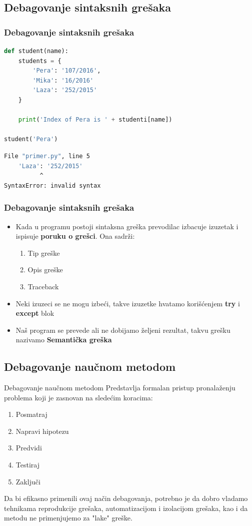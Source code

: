 \documentclass{beamer}
\begin{document}
\subsection{Debagovanje sintaksnih grešaka}
\begin{frame}[fragile]
\frametitle{Debagovanje sintaksnih grešaka}
\begin{exampleblock}{}
\begin{lstlisting}[language = python]
def student(name):
    students = {
        'Pera': '107/2016',
        'Mika': '16/2016'
        'Laza': '252/2015'
    }

    print('Index of Pera is ' + studenti[name])

student('Pera')
\end{lstlisting}
\end{exampleblock}
\begin{exampleblock}{}
\begin{lstlisting}[language = bash]
  File "primer.py", line 5
    'Laza': '252/2015'
          ^
SyntaxError: invalid syntax
\end{lstlisting}
\end{exampleblock}
\end{frame}
\begin{frame}
\frametitle{Debagovanje sintaksnih grešaka}
\begin{itemize}
\item Kada u programu postoji sintaksna greška prevodilac izbacuje izuzetak i ispisuje \textbf{poruku o grešci}. Ona sadrži:
\begin{enumerate}
    \item Tip greške
    \item Opis greške
    \item Traceback
\end{enumerate}
\item Neki izuzeci se ne mogu izbeći, takve izuzetke hvatamo korišćenjem \textbf{try} i \textbf{except} blok
\item Naš program se prevede ali ne dobijamo željeni rezultat, takvu grešku nazivamo \textbf{Semantička greška}
\end{itemize}
\end{frame}
\subsection{Debagovanje naučnom metodom}
\begin{frame}{Debagovanje naučnom metodom}
Predstavlja formalan pristup pronalaženju problema koji je zasnovan na sledećim koracima:
\begin{enumerate}
    \item Posmatraj
    \item Napravi hipotezu
    \item Predvidi
    \item Testiraj
    \item Zaključi
\end{enumerate}
Da bi efikasno primenili ovaj način debagovanja, potrebno je da dobro vladamo tehnikama reprodukcije grešaka, automatizacijom i izolacijom grešaka, kao i da metodu ne primenjujemo za "lake" greške.
\end{frame}
\end{document}
